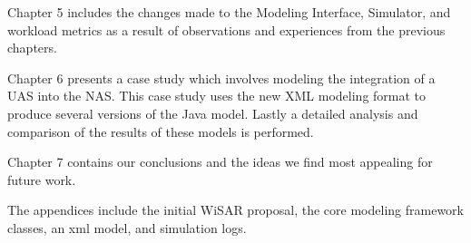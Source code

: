 Chapter 5 includes the changes made to the Modeling Interface, Simulator, and workload metrics as a result of observations and experiences from the previous chapters.  

Chapter 6 presents a case study which involves modeling the integration of a UAS into the NAS.  This case study uses the new XML modeling format to produce several versions of the Java model.  Lastly a detailed analysis and comparison of the results of these models is performed.

Chapter 7 contains our conclusions and the ideas we find most appealing for future work.

The appendices include the initial WiSAR proposal, the core modeling framework classes, an xml model, and simulation logs.